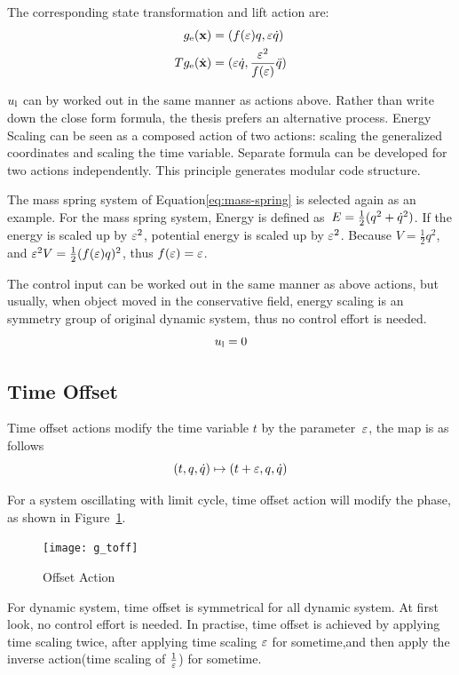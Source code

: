 The corresponding  state transformation and lift action are:
\begin{align}
g_{\mathrm{e}}(\mathbf{x})&=(f(\varepsilon) q,\varepsilon \dot{q}) \nonumber\\
Tg_{\mathrm{e}}(\dot{\mathbf{x}})&=(\varepsilon \dot{q},\frac{\varepsilon^2}{f(\varepsilon)}\ddot{q})
\end{align}

$u_{\mathrm{l}}$ can by worked out in the same manner as actions above.
Rather than write down the close form formula, the thesis prefers an alternative process.
Energy Scaling can be seen as a composed action of two actions: scaling the generalized coordinates and scaling the time variable.
Separate formula can be developed for two actions independently.
This principle generates modular code structure.




The mass spring system of Equation\ref{eq:mass-spring} is selected again as an example.
 For the mass spring system, Energy is defined as~$E=\frac{1}{2}(q^2+\dot{q}^2)$.
 If the energy is scaled up by $\varepsilon^2$,  potential energy is scaled up by $\varepsilon^2$.
 Because $V= \frac{1}{2}q^2$, and $\varepsilon^2 V=\frac{1}{2}(f(\varepsilon)q)^2$, thus $f(\varepsilon)=\varepsilon$.
 
 
The control input can be worked out in the same manner as above actions, but usually, when object moved in the conservative field, energy scaling is an symmetry group of original dynamic system, thus no control effort is needed.
\[
u_{\mathrm{l}}=0
\]



\subsection*{Time Offset}

Time offset actions modify the time  variable $t$ by the parameter~$\varepsilon$, the map is as follows
\[
(t,q,\dot{q}) \mapsto (t+\varepsilon,q,\dot{q})
\]


For a system oscillating with limit cycle, time offset action will modify the phase, as shown in Figure~\ref{fig:gtoff}.
\begin{figure}
  \begin{center}
      \texttt{[image: g\_toff]}
    \caption{Offset Action}
    \label{fig:gtoff}
\end{center}
\end{figure}

For dynamic system, time offset is symmetrical for all dynamic system.
At first look, no control effort is needed.
In practise, time offset is achieved by applying time scaling twice, after applying time scaling $\varepsilon$ for sometime,and then apply the inverse action(time scaling of $\frac{1}{\varepsilon}$) for sometime.



